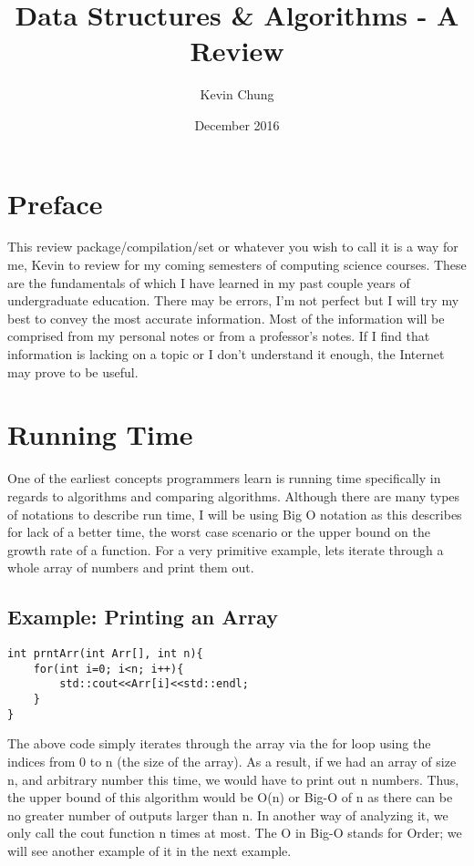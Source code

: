 \documentclass{article}
\title{Data Structures \& Algorithms - A Review}
\author{Kevin Chung}
\date{December 2016}
\begin{document}
\begin{titlepage}
\maketitle
\thispagestyle{empty}
\end{titlepage}

\newpage
\tableofcontents
\thispagestyle{empty}
\newpage

\clearpage
\setcounter{page}{1}

\section{Preface}
This review package/compilation/set or whatever you wish to call it is a way for me, Kevin to review for my coming semesters of computing science courses. These are the fundamentals of which I have learned in my past couple years of undergraduate education. There may be errors, I'm not perfect but I will try my best to convey the most accurate information. Most of the information will be comprised from my personal notes or from a professor's notes. If I find that information is lacking on a topic or I don't understand it enough, the Internet may prove to be useful. 

\section{Running Time}
One of the earliest concepts programmers learn is running time specifically in regards to algorithms and comparing algorithms. Although there are many types of notations to describe run time, I will be using Big O notation as this describes for lack of a better time, the worst case scenario or the upper bound on the growth rate of a function. For a very primitive example, lets iterate through a whole array of numbers and print them out. 

\subsection{Example: Printing an Array}
\begin{lstlisting}
int prntArr(int Arr[], int n){
	for(int i=0; i<n; i++){
		std::cout<<Arr[i]<<std::endl;
	}
}
\end{lstlisting}

\noindent The above code simply iterates through the array via the for loop using the indices from 0 to n (the size of the array). As a result, if we had an array of size n, and arbitrary number this time, we would have to print out n numbers. Thus, the upper bound of this algorithm would be O(n) or Big-O of n as there can be no greater number of outputs larger than n. In another way of analyzing it, we only call the cout function n times at most. The O in Big-O stands for Order; we will see another example of it in the next example. 
\\
\end{document}
